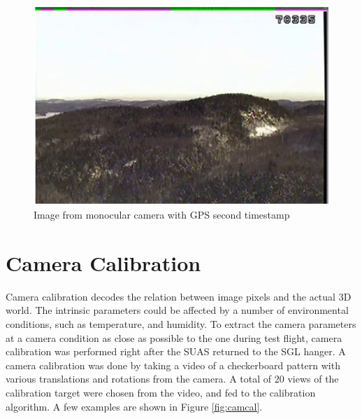 \begin{figure}[h]
  \centering
  \includegraphics[width=12cm,keepaspectratio=true]{./Figures/video_snapshot.jpg}
  \caption{Image from monocular camera with GPS second timestamp}
  \label{fig:video_snapshot}
\end{figure}

\FloatBarrier

\section{Camera Calibration}\label{sec:camcal}
Camera calibration decodes the relation between image pixels and the
actual 3D world. The intrinsic parameters could be affected by a
number of environmental conditions, such as temperature, and humidity.
To extract the camera parameters at a camera condition as close as
possible to the one during test flight, camera calibration was
performed right after the SUAS returned to the SGL hanger. A camera
calibration was done by taking a video of a checkerboard pattern with
various translations and rotations from the camera. A total of 20 views
of the calibration target were chosen from the video, and fed to the
calibration algorithm. A few examples are shown in Figure
\ref{fig:camcal}.


